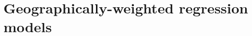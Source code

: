 \documentclass[authoryear, review, 11pt]{elsarticle}
\begin{document}
%		
  
	
\section{Geographically-weighted regression models}
\end{document}
